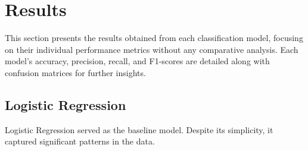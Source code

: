\documentclass[10pt,twocolumn,letterpaper]{article}
\begin{document}





\section{Results}

This section presents the results obtained from each classification model, focusing on their individual performance metrics without any comparative analysis. Each model's accuracy, precision, recall, and F1-scores are detailed along with confusion matrices for further insights.

\subsection{Logistic Regression}

Logistic Regression served as the baseline model. Despite its simplicity, it captured significant patterns in the data.

\begin{table}[h]
\small
\begin{center}
\caption{Performance Metrics for Logistic Regression}
\vspace{0.1cm}
\end{center}
\end{table}
\end{document}
